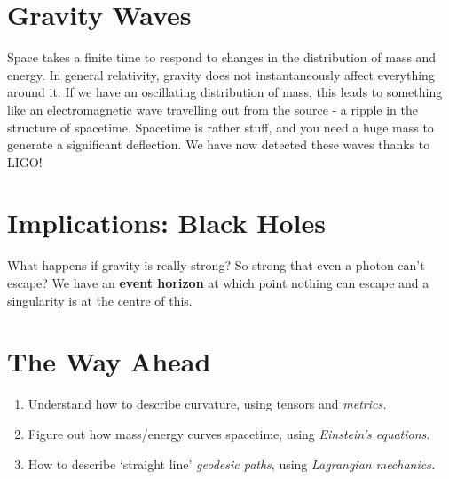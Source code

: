\documentclass[a4paper, 11pt, normalem]{report}
\begin{document}
\section{Gravity Waves}
Space takes a finite time to respond to changes in the distribution of mass and energy. 
In general relativity, gravity does not instantaneously affect everything around it. 
If we have an oscillating distribution of mass, this leads to something like an electromagnetic wave travelling out from the source - a ripple in the structure of spacetime. 
Spacetime is rather stuff, and you need a huge mass to generate a significant deflection. 
We have now detected these waves thanks to LIGO!

\section{Implications: Black Holes}
What happens if gravity is really strong? 
So strong that even a photon can't escape?
We have an \textbf{event horizon} at which point nothing can escape and a singularity is at the centre of this. 

\section{The Way Ahead}
\begin{enumerate}
    \item Understand how to describe curvature, using tensors and \emph{metrics.}
    \item Figure out how mass/energy curves spacetime, using \emph{Einstein's equations.}
    \item How to describe `straight line' \emph{geodesic paths}, using \emph{Lagrangian mechanics.}
\end{enumerate}
\end{document}
